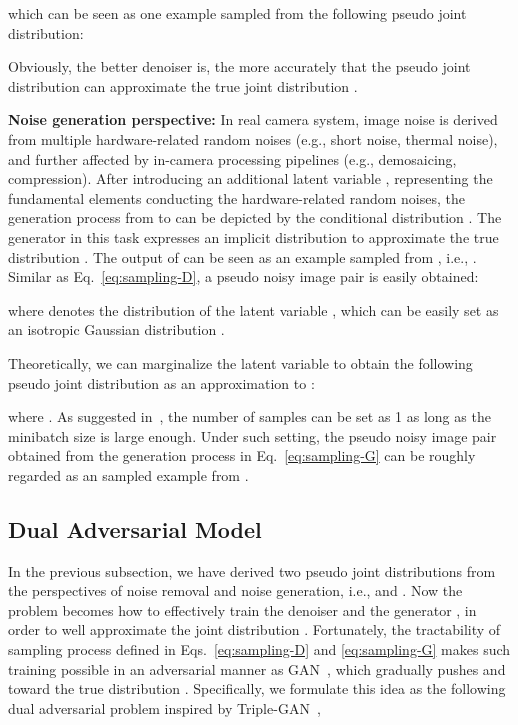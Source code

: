 \documentclass[runningheads]{llncs}
\begin{document}
which can be seen as one example sampled from the following pseudo joint distribution:

Obviously, the better denoiser  is, the more accurately that the pseudo joint distribution 
can approximate the true joint distribution .

\vspace{2mm}
\noindent \textbf{Noise generation perspective:}
In real camera system, image noise is derived from multiple hardware-related random noises (e.g., short noise, thermal noise), and further affected by in-camera processing
pipelines (e.g., demosaicing, compression). After introducing an additional latent variable , representing the fundamental elements conducting the hardware-related
random noises, the generation process from  to  can be depicted by the conditional distribution
.
The generator  in this task expresses an implicit distribution 
to approximate the true distribution . The output of  can be seen as an example sampled
from , i.e., .
Similar as Eq.~\eqref{eq:sampling-D}, a pseudo noisy image pair  is easily obtained:

where  denotes the distribution of the latent variable , which can be easily set as an isotropic
Gaussian distribution .

Theoretically, we can marginalize the latent variable  to obtain 
the following pseudo joint distribution  as an approximation to 
:

where . As suggested in~\cite{Kingma2014}, the number of samples  can be set as 1
as long as the minibatch size is large enough. Under such setting, the pseudo noisy image pair  obtained from the generation process in
Eq.~\eqref{eq:sampling-G} can be roughly regarded as an sampled example from .

\subsection{Dual Adversarial Model}

In the previous subsection, we have derived two pseudo joint distributions  
from the perspectives of noise removal and noise generation, i.e.,  and .
Now the problem becomes how to effectively train the denoiser  and the generator , in order to
well approximate the joint distribution . Fortunately, the
tractability of sampling process defined in Eqs.~\eqref{eq:sampling-D} and \eqref{eq:sampling-G}
makes such training possible in an adversarial manner as GAN~\cite{goodfellow2014generative}, which
gradually pushes  and  toward
the true distribution .
Specifically, we formulate this idea as the following dual adversarial problem inspired by
Triple-GAN~\cite{chongxuan2017triple},
\end{document}
